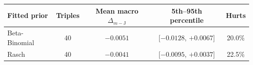 \begin{tabular}{lcccc}
\toprule
Fitted prior & Triples & Mean macro $\Delta_{m-\mathrm{J}}$ & 5th--95th percentile & Hurts\\
\midrule
Beta-Binomial & 40 & $\minus0.0051$ & [$\minus0.0128$, $+0.0067$] & 20.0\% \\
Rasch & 40 & $\minus0.0041$ & [$\minus0.0095$, $+0.0037$] & 22.5\% \\
\bottomrule
\end{tabular}
